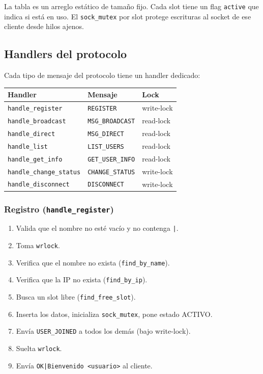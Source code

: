 \documentclass[12pt,a4paper]{article}
\begin{document}
La tabla es un arreglo estático de tamaño fijo.  Cada slot tiene un flag
\texttt{active} que indica si está en uso.  El \texttt{sock\_mutex} por slot
protege escrituras al socket de ese cliente desde hilos ajenos.

\subsection{Handlers del protocolo}

Cada tipo de mensaje del protocolo tiene un handler dedicado:

\begin{center}
\begin{tabular}{lll}
\toprule
\textbf{Handler} & \textbf{Mensaje} & \textbf{Lock} \\
\midrule
\texttt{handle\_register}       & \texttt{REGISTER}        & write-lock \\
\texttt{handle\_broadcast}      & \texttt{MSG\_BROADCAST}  & read-lock \\
\texttt{handle\_direct}         & \texttt{MSG\_DIRECT}     & read-lock \\
\texttt{handle\_list}           & \texttt{LIST\_USERS}     & read-lock \\
\texttt{handle\_get\_info}      & \texttt{GET\_USER\_INFO} & read-lock \\
\texttt{handle\_change\_status} & \texttt{CHANGE\_STATUS}  & write-lock \\
\texttt{handle\_disconnect}     & \texttt{DISCONNECT}      & write-lock \\
\bottomrule
\end{tabular}
\end{center}

\subsubsection{Registro (\texttt{handle\_register})}

\begin{enumerate}[nosep]
    \item Valida que el nombre no esté vacío y no contenga \texttt{|}.
    \item Toma \texttt{wrlock}.
    \item Verifica que el nombre no exista (\texttt{find\_by\_name}).
    \item Verifica que la IP no exista (\texttt{find\_by\_ip}).
    \item Busca un slot libre (\texttt{find\_free\_slot}).
    \item Inserta los datos, inicializa \texttt{sock\_mutex}, pone estado ACTIVO.
    \item Envía \texttt{USER\_JOINED} a todos los demás (bajo write-lock).
    \item Suelta \texttt{wrlock}.
    \item Envía \texttt{OK|Bienvenido <usuario>} al cliente.
\end{enumerate}
\end{document}
